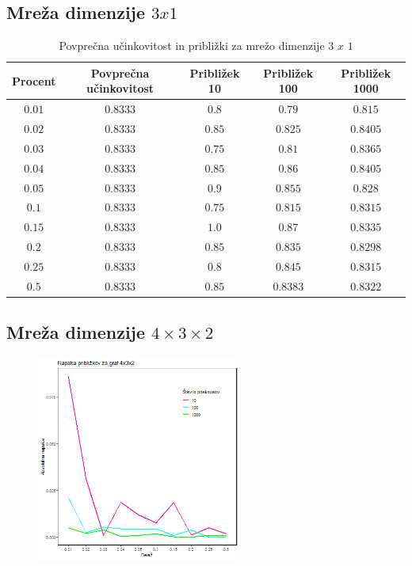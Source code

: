 \documentclass[a4paper, 16pt]{article}
\begin{document}
    \subsection{Mreža dimenzije $3 x 1$}
    \begin{table}[!h]
        \begin{tabular}{c|c|c|c|c}
            Procent & Povprečna učinkovitost & Približek 10 & Približek 100 & Približek 1000 \\ \hline
            $0.01$ & $0.8333$ & $0.8$  & $0.79$   & $0.815$ \\
            $0.02$ & $0.8333$ & $0.85$ & $0.825$  & $0.8405$ \\
            $0.03$ & $0.8333$ & $0.75$ & $0.81$   & $0.8365$ \\
            $0.04$ & $0.8333$ & $0.85$ & $0.86$   & $0.8405$ \\
            $0.05$ & $0.8333$ & $0.9$  & $0.855$  & $0.828$ \\
            $0.1$  & $0.8333$ & $0.75$ & $0.815$  & $0.8315$ \\
            $0.15$ & $0.8333$ & $1.0$  & $0.87$   & $0.8335$ \\
            $0.2$  & $0.8333$ & $0.85$ & $0.835$  & $0.8298$ \\
            $0.25$ & $0.8333$ & $0.8$  & $0.845$  & $0.8315$ \\
            $0.5$  & $0.8333$ & $0.85$ & $0.8383$ & $0.8322$ \\

        \end{tabular}
        \caption{Povprečna učinkovitost in približki za mrežo dimenzije $3$ $x$ $1$}
        \label{table: 6}
    \end{table}

    \subsection{Mreža dimenzije $4 \times 3 \times 2$}
    \begin{figure}[!h]
        \centering
        \includegraphics[width = 0.6\textwidth]{../Vizualizacija/Grid_4x3x2.png}
        \label{fig: grid}
    \end{figure}
\end{document}
